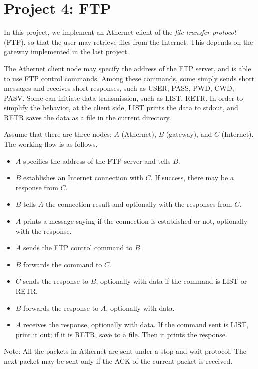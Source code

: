 \documentclass[11pt, conference]{IEEEtran}
\begin{document}
\section{Project 4: FTP}

In this project, we implement an Athernet client of the \emph{file transfer protocol} (FTP), so that the user may retrieve files from the Internet. This depends on the gateway implemented in the last project.

The Athernet client node may specify the address of the FTP server, and is able to use FTP control commands. Among these commands, some simply sends short messages and receives short responses, such as \textsf{USER}, \textsf{PASS}, \textsf{PWD}, \textsf{CWD}, \textsf{PASV}. Some can initiate data transmission, such as \textsf{LIST}, \textsf{RETR}. In order to simplify the behavior, at the client side, \textsf{LIST} prints the data to \textsf{stdout}, and \textsf{RETR} saves the data as a file in the current directory.

Assume that there are three nodes: $A$ (Athernet), $B$ (gateway), and $C$ (Internet). The working flow is as follows.
\begin{itemize}
\item $A$ specifies the address of the FTP server and tells $B$.
\item $B$ establishes an Internet connection with $C$. If success, there may be a response from $C$.
\item $B$ tells $A$ the connection result and optionally with the responses from $C$.
\item $A$ prints a message saying if the connection is established or not, optionally with the response.
\item $A$ sends the FTP control command to $B$.
\item $B$ forwards the command to $C$.
\item $C$ sends the response to $B$, optionally with data if the command is \textsf{LIST} or \textsf{RETR}.
\item $B$ forwards the response to $A$, optionally with data.
\item $A$ receives the response, optionally with data. If the command sent is \textsf{LIST}, print it out; if it is \textsf{RETR}, save to a file. Then it prints the response.
\end{itemize}
Note: All the packets in Athernet are sent under a stop-and-wait protocol. The next packet may be sent only if the ACK of the current packet is received.
\end{document}
